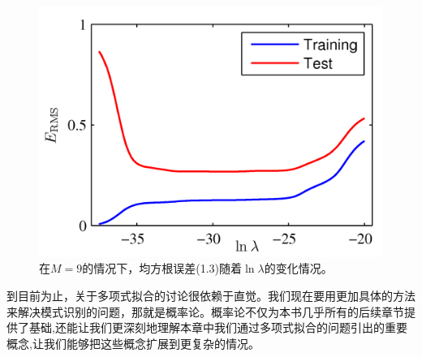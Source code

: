 \documentclass[b5paper]{book}
\numberwithin{equation}{chapter}
\begin{document}
{\begin{table}
	\end{table}
	\begin{figure}[H]
		\centering
		\includegraphics[scale=0.8]{Images/1-8.png}
		\caption{在$M=9$的情况下，均方根误差(1.3)随着$\ln \lambda$的变化情况。} 
		\label{fig:1-8}	
	\end{figure}
	到目前为止，关于多项式拟合的讨论很依赖于直觉。我们现在要用更加具体的方法来解决模式识别的问题，那就是概率论。概率论不仅为本书几乎所有的后续章节提供了基础,还能让我们更深刻地理解本章中我们通过多项式拟合的问题引出的重要概念,让我们能够把这些概念扩展到更复杂的情况。
	}
\end{document}
